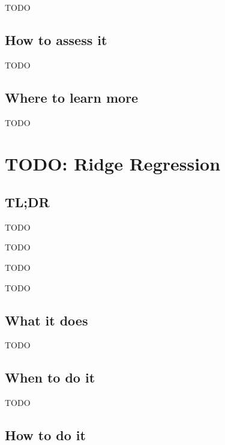 \documentclass[
]{book}
\providecommand{\tightlist}{%
  \setlength{\itemsep}{0pt}\setlength{\parskip}{0pt}}
\begin{document}
TODO

\hypertarget{how-to-assess-it-11}{%
\section{How to assess it}\label{how-to-assess-it-11}}

TODO

\hypertarget{where-to-learn-more-11}{%
\section{Where to learn more}\label{where-to-learn-more-11}}

TODO

\hypertarget{ridge-regression}{%
\chapter{TODO: Ridge Regression}\label{ridge-regression}}

\hypertarget{tldr-12}{%
\section{TL;DR}\label{tldr-12}}

\begin{description}
\tightlist
\item[What it does]
TODO
\item[When to do it]
TODO
\item[How to do it]
TODO
\item[How to assess it]
TODO
\end{description}

\hypertarget{what-it-does-12}{%
\section{What it does}\label{what-it-does-12}}

TODO

\hypertarget{when-to-do-it-12}{%
\section{When to do it}\label{when-to-do-it-12}}

TODO

\hypertarget{how-to-do-it-12}{%
\section{How to do it}\label{how-to-do-it-12}}
\end{document}
